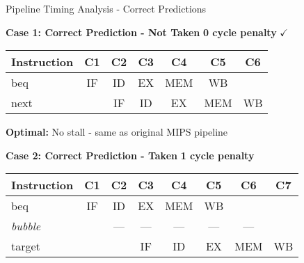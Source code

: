 \documentclass[aspectratio=169,12pt]{beamer}
\begin{document}
\begin{frame}{Pipeline Timing Analysis - Correct Predictions}
\scriptsize
\vspace{0.3cm}

\begin{center}
\colorbox{green!10}{
\begin{minipage}{0.95\textwidth}
\textbf{Case 1: Correct Prediction - Not Taken} \hfill \textcolor{green!70!black}{\textbf{0 cycle penalty} $\checkmark$}
\vspace{0.1cm}

\begin{tabular}{l|c|c|c|c|c|c}
\textbf{Instruction} & \textbf{C1} & \textbf{C2} & \textbf{C3} & \textbf{C4} & \textbf{C5} & \textbf{C6} \\
\hline
beq & \cellcolor{normalexec!40}IF & \cellcolor{normalexec!40}ID & \cellcolor{normalexec!40}EX & \cellcolor{normalexec!40}MEM & \cellcolor{normalexec!40}WB & \\
next & & \cellcolor{normalexec!40}IF & \cellcolor{normalexec!40}ID & \cellcolor{normalexec!40}EX & \cellcolor{normalexec!40}MEM & \cellcolor{normalexec!40}WB \\
\end{tabular}

\vspace{0.05cm}
\footnotesize \textbf{Optimal:} No stall - same as original MIPS pipeline
\end{minipage}
}
\end{center}

\vspace{0.4cm}

\begin{center}
\colorbox{green!10}{
\begin{minipage}{0.95\textwidth}
\textbf{Case 2: Correct Prediction - Taken} \hfill \textcolor{orange!70!black}{\textbf{1 cycle penalty}}
\vspace{0.1cm}

\begin{tabular}{l|c|c|c|c|c|c|c}
\textbf{Instruction} & \textbf{C1} & \textbf{C2} & \textbf{C3} & \textbf{C4} & \textbf{C5} & \textbf{C6} & \textbf{C7} \\
\hline
beq & \cellcolor{normalexec!40}IF & \cellcolor{normalexec!40}ID & \cellcolor{normalexec!40}EX & \cellcolor{normalexec!40}MEM & \cellcolor{normalexec!40}WB & & \\
\textit{bubble} & & \cellcolor{stallcolor!40}--- & \cellcolor{emptycolor}--- & \cellcolor{emptycolor}--- & \cellcolor{emptycolor}--- & \cellcolor{emptycolor}--- & \\
target & & & \cellcolor{normalexec!40}IF & \cellcolor{normalexec!40}ID & \cellcolor{normalexec!40}EX & \cellcolor{normalexec!40}MEM & \cellcolor{normalexec!40}WB \\
\end{tabular}


\end{minipage}}
\end{center}
\end{frame}
\end{document}
